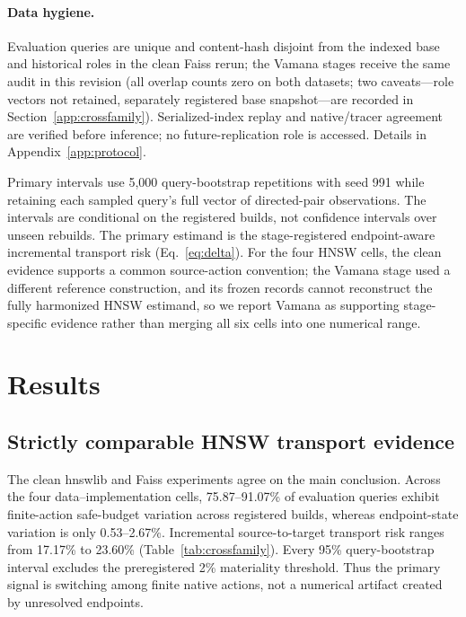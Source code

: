 \documentclass{article}
\begin{document}
\paragraph{Data hygiene.}
Evaluation queries are unique and content-hash disjoint from the indexed base and historical roles in the
clean Faiss rerun; the Vamana stages receive the same audit in this revision (all overlap counts zero on
both datasets; two caveats---role vectors not retained, separately registered base snapshot---are recorded
in Section~\ref{app:crossfamily}). Serialized-index replay and native/tracer agreement are verified before
inference; no future-replication role is accessed. Details in Appendix~\ref{app:protocol}.

Primary intervals use 5{,}000 query-bootstrap repetitions with seed 991 while retaining each sampled
query's full vector of directed-pair observations. The intervals are conditional on the registered builds,
not confidence intervals over unseen rebuilds. The primary estimand is the stage-registered endpoint-aware
incremental transport risk (Eq.~\ref{eq:delta}). For the four HNSW cells, the clean evidence supports a
common source-action convention; the Vamana stage used a different reference construction, and its frozen
records cannot reconstruct the fully harmonized HNSW estimand, so we report Vamana as supporting
stage-specific evidence rather than merging all six cells into one numerical range.

\section{Results}
\label{sec:results}

\subsection{Strictly comparable HNSW transport evidence}

The clean hnswlib and Faiss experiments agree on the main conclusion. Across the four data--implementation
cells, 75.87--91.07\% of evaluation queries exhibit finite-action safe-budget variation across registered
builds, whereas endpoint-state variation is only 0.53--2.67\%. Incremental source-to-target transport risk
ranges from 17.17\% to 23.60\% (Table~\ref{tab:crossfamily}). Every 95\% query-bootstrap interval excludes
the preregistered 2\% materiality threshold. Thus the primary signal is switching among finite native
actions, not a numerical artifact created by unresolved endpoints.
\end{document}
